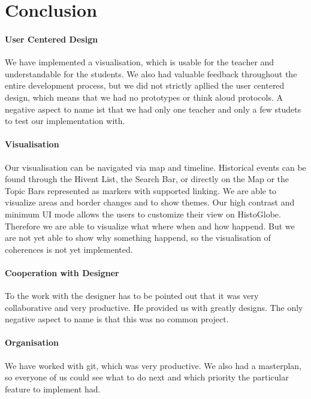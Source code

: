 \section{Conclusion} %
\label{sec:conclusion}

\paragraph{User Centered Design} %
We have implemented a visualisation, which is usable for the teacher and understandable for the students. We also had valuable feedback throughout the entire development process, but we did not strictly apllied the user centered design, which means that we had no prototypes or think aloud protocols. A negative aspect to name ist that we had only one teacher and only a few studets to test our implementation with.

\paragraph{Visualisation} %
Our visualisation can be navigated via map and timeline. Historical events can be found through the Hivent List, the Search Bar, or directly on the Map or the Topic Bars represented as markers with supported linking. We are able to visualize areas and border changes and to show themes. Our high contrast and minimum UI mode allows the users to customize their view on HistoGlobe. Therefore we are able to visualize what where when and how happend. But we are not yet able to show why something happend, so the visualisation of coherences is not yet implemented.

\paragraph{Cooperation with Designer} %
To the work with the designer has to be pointed out that it was very collaborative and very productive. He provided us with greatly designs. The only negative aspect to name is that this was no common project. %

\paragraph{Organisation} %
We have worked with git, which was very productive. We also had a masterplan, so everyone of us could see what to do next and which priority the particular feature to implement had. 

